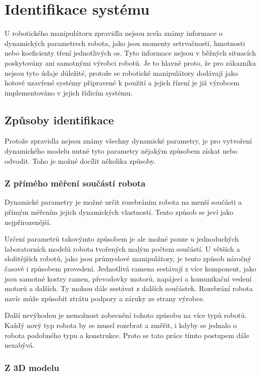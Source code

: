 

\chapter{Identifikace systému}

U robotického manipulátoru zpravidla nejsou zcela známy informace o dynamických parametrech robota, jako jsou momenty setrvačnosti, hmotnosti nebo koeficienty tření jednotlivých os. Tyto informace nejsou v běžných situacích poskytovány ani samotnými výrobci robotů. Je to hlavně proto, že pro zákazníka nejsou tyto údaje důležité, protože se robotické manipulátory dodávají jako hotové uzavřené systémy připravené k použití a jejich řízení je již výrobcem implementováno v jejich řídicím systému.

\section{Způsoby identifikace}

Protože zpravidla nejsou známy všechny dynamické parametry, je pro vytvoření dynamického modelu nutné tyto parametry nějakým způsobem získat nebo odvodit. Toho je možné docílit několika způsoby.

\subsection{Z přímého měření součástí robota}

Dynamické parametry je možné určit rozebráním robota na menší součásti a přímým měřením jejich dynamických vlastností. Tento způsob se jeví jako nejpřirozenější.

Určení parametrů takovýmto způsobem je ale možné pouze u jednoduchých laboratorních modelů robota tvořených malým počtem součástí. U větších a složitějších robotů, jako jsou průmyslové manipulátory, je tento způsob náročný časově i způsobem provedení. Jednotlivá ramena sestávají z více komponent, jako jsou samotné kostry ramen, převodovky motorů, napájecí a komunikační vedení motorů a dalších. Ty mohou dále sestávat z dalších součástek. Rozebrání robota navíc může způsobit ztrátu podpory a záruky ze strany výrobce.

Další nevýhodou je nemožnost zobecnění tohoto způsobu na více typů robotů. Každý nový typ robota by se musel rozebrat a změřit, i kdyby se jednalo o robota podobného typu a konstrukce. Proto se tato práce tímto postupem dále nezabývá.    

\subsection{Z 3D modelu}

